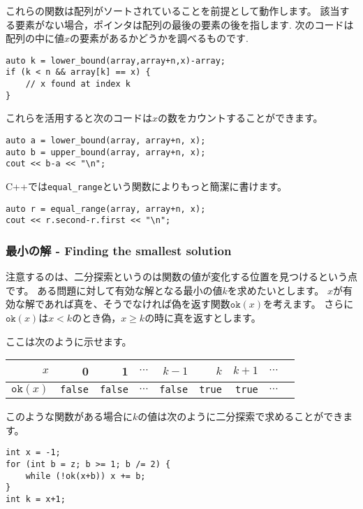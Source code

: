 これらの関数は配列がソートされていることを前提として動作します。
該当する要素がない場合，ポインタは配列の最後の要素の後を指します.
次のコードは配列の中に値$x$の要素があるかどうかを調べるものです.

\begin{lstlisting}
auto k = lower_bound(array,array+n,x)-array;
if (k < n && array[k] == x) {
    // x found at index k
}
\end{lstlisting}

これらを活用すると次のコードは$x$の数をカウントすることができます。

\begin{lstlisting}
auto a = lower_bound(array, array+n, x);
auto b = upper_bound(array, array+n, x);
cout << b-a << "\n";
\end{lstlisting}

C++では\texttt{equal\_range}という関数によりもっと簡潔に書けます。

\begin{lstlisting}
auto r = equal_range(array, array+n, x);
cout << r.second-r.first << "\n";
\end{lstlisting}

\subsubsection{最小の解 - Finding the smallest solution}

注意するのは、二分探索というのは関数の値が変化する位置を見つけるという点です。
ある問題に対して有効な解となる最小の値$k$を求めたいとします。
$x$が有効な解であれば真を、そうでなければ偽を返す関数$\texttt{ok}(x)$を考えます。
さらに$\texttt{ok}(x)$は$x<k$のとき偽，$x \ge k$の時に真を返すとします。

ここは次のように示せます。
\begin{center}
\begin{tabular}{r|rrrrrrrr}
$x$ & 0 & 1 & $\cdots$ & $k-1$ & $k$ & $k+1$ & $\cdots$ \\
\hline
$\texttt{ok}(x)$ & \texttt{false} & \texttt{false}
& $\cdots$ & \texttt{false} & \texttt{true} & \texttt{true} & $\cdots$ \\
\end{tabular}
\end{center}

\noindent
このような関数がある場合に$k$の値は次のように二分探索で求めることができます。

\begin{lstlisting}
int x = -1;
for (int b = z; b >= 1; b /= 2) {
    while (!ok(x+b)) x += b;
}
int k = x+1;
\end{lstlisting}

